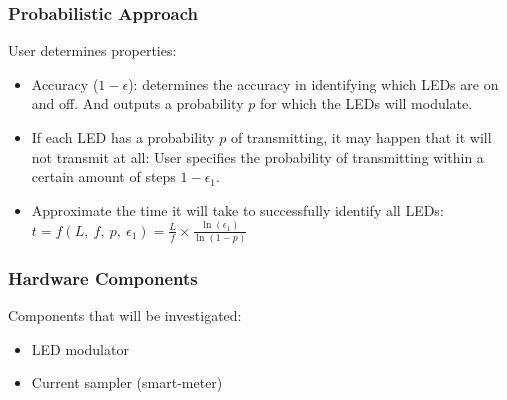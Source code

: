 \documentclass{beamer}
\begin{document}
	\begin{frame}\frametitle{Probabilistic Approach}

		User determines properties:

		\begin{itemize}

			\item Accuracy ($1 - \epsilon$): determines the accuracy in identifying which LEDs are on and off. And outputs a probability $p$ for which the LEDs will modulate.

			\item If each LED has a probability $p$ of transmitting, it may happen that it will not transmit at all: User specifies the probability of transmitting within a certain amount of steps $1 - \epsilon_1$.

			\item Approximate the time it will take to successfully identify all LEDs: $t = f(L,\ f,\ p,\ \epsilon_1) = \frac{L}{f} \times \frac{\ln(\epsilon_1)}{\ln(1 - p)}$

		\end{itemize}
		
	\end{frame}


















	\begin{frame}\frametitle{Hardware Components}

		Components that will be investigated: 

		\begin{itemize}

			\item LED modulator

			\item Current sampler (smart-meter)

		\end{itemize}
		
	\end{frame}
\end{document}
